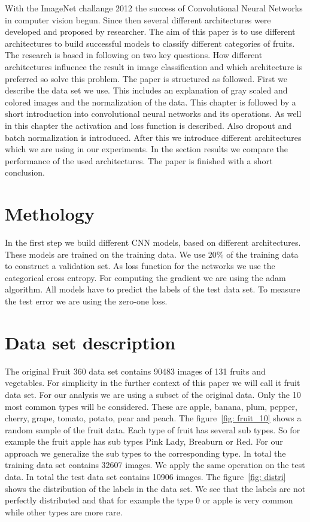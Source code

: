 \documentclass[11pt, a4paper]{article}
\begin{document}
With the ImageNet challange 2012 the success of Convolutional Neural Networks in computer vision begun. Since then several different architectures were developed and proposed by researcher.
The aim of this paper is to use different architectures to build successful models to classify different categories of fruits.
The research is based in following on two key questions. How different architectures influence the result in image classification and which architecture is preferred so solve this problem.
The paper is structured as followed. First we describe the data set we use. This includes an explanation of gray scaled and colored images and the normalization of the data. This chapter is followed by a short introduction into convolutional neural networks and its operations. As well in this chapter the activation and loss function is described. Also dropout and batch normalization is introduced. After this we introduce different architectures which we are using in our experiments. In the section results we compare the performance of the used architectures. The paper is finished with a short conclusion.


\section{Methology}

In the first step we build different CNN models, based on different architectures. These models are trained on the training data. We use 20\% of the training data to construct a validation set. As loss function for the networks we use the categorical cross entropy. For computing the gradient we are using the adam algorithm. All models have to predict the labels of the test data set. To measure the test error we are using the zero-one loss.


\section{Data set description}
The original Fruit 360 data set contains 90483 images of 131 fruits and vegetables.\cite{kaggle} For simplicity in the further context of this paper we will call it fruit data set.
For our analysis we are using a subset of the original data.
Only the 10 most common types will be considered.
These are apple, banana, plum, pepper, cherry, grape, tomato, potato, pear and peach. The figure~\ref{fig: fruit_10} shows a random sample of the fruit data.
Each type of fruit has several sub types. So for example the fruit apple has sub types Pink Lady, Breaburn or Red. For our approach we generalize the sub types to the corresponding type. In total the training data set contains 32607 images.
We apply the same operation on the test data. In total the test data set contains 10906 images.
The figure~\ref{fig: distri} shows the distribution of the labels in the data set. We see that the labels are not perfectly distributed and that for example the type 0 or apple is very common while other types are more rare.
\end{document}
